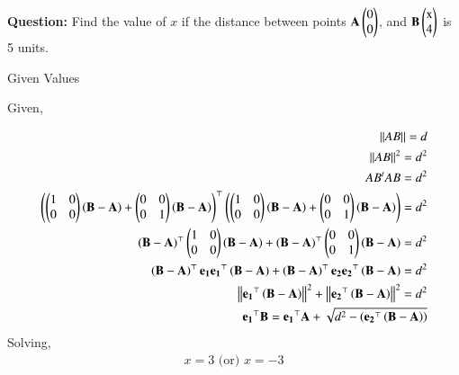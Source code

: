 \documentclass[journal]{IEEEtran}
\begin{document}

\vspace{3cm}

\title{}
\author{EE24BTECH11053 - S A Aravind Eswar
}
{\let\newpage\relax\maketitle}

\renewcommand{\thefigure}{\theenumi}
\renewcommand{\thetable}{\theenumi}
\setlength{\intextsep}{10pt} %


\renewcommand{\thetable}{\theenumi}

\textbf{Question:} Find the value of $x$ if the distance between points $\mathbf{A}\begin{pmatrix}0\\0\end{pmatrix}$, and $\vec{B}\myvec{$x$\\4}$ is 5 units.\\

\solution
\begin{table}[h]
	\centering
	
	\caption{Given Values}
	\label{tab:1}
\end{table}

Given,

\begin{align}\left\lVert{AB}\right\rVert = d\\\left\lVert{AB}\right\rVert^2 = d^2\\AB^tAB = d^2\\\left(\begin{pmatrix}1 & 0\\0 & 0\end{pmatrix}\left(\mathbf{B}-\mathbf{A}\right)+\begin{pmatrix}0 & 0\\0 & 1\end{pmatrix}\left(\mathbf{B}-\mathbf{A}\right)\right)^\top\left(\begin{pmatrix}1 & 0\\0 & 0\end{pmatrix}\left(\mathbf{B}-\mathbf{A}\right)+\begin{pmatrix}0 & 0\\0 & 1\end{pmatrix}\left(\mathbf{B}-\mathbf{A}\right)\right) = d^2\\\left(\mathbf{B}-\mathbf{A}\right)^\top\begin{pmatrix}1 & 0\\0 & 0\end{pmatrix}\left(\mathbf{B}-\mathbf{A}\right) + \left(\mathbf{B}-\mathbf{A}\right)^\top\begin{pmatrix}0 & 0\\0 & 1\end{pmatrix}\left(\mathbf{B}-\mathbf{A}\right) = d^2\\\left(\mathbf{B}-\mathbf{A}\right)^\top \mathbf{e_1} \mathbf{e_1}^\top\left(\mathbf{B}-\mathbf{A}\right) + \left(\mathbf{B}-\mathbf{A}\right)^\top\mathbf{e_2}\mathbf{e_2}^\top\left(\mathbf{B}-\mathbf{A}\right) = d^2\\\left\lVert\mathbf{e_1}^\top\left(\mathbf{B}-\mathbf{A}\right)\right\rVert^2 + \left\lVert\mathbf{e_2}^\top\left(\mathbf{B}-\mathbf{A}\right)\right\rVert^2 = d^2\\\mathbf{e_1}^\top\mathbf{B} = \mathbf{e_1}^\top\mathbf{A} + \sqrt{d^2 - \left(\mathbf{e_2}^\top\left(\mathbf{B}-\mathbf{A}\right)\right)}\end{align}
Solving,\\
	\begin{align}x = 3  \text{ (or) }  x = -3\end{align}
\end{document}
